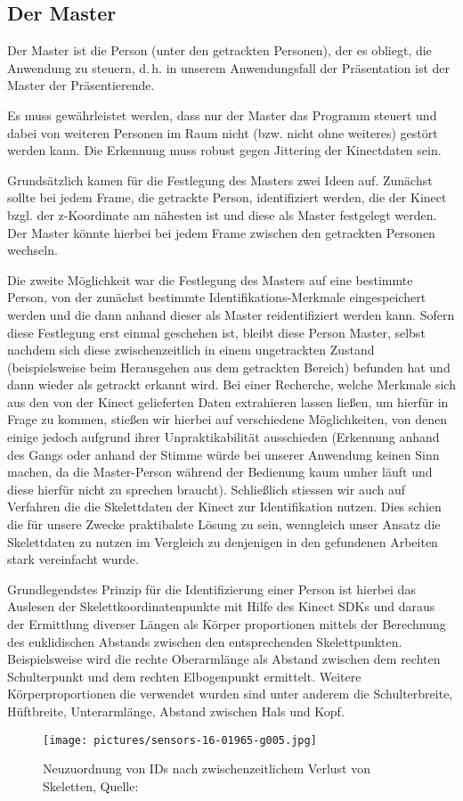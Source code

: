 \subsection{Der Master}
	Der Master ist die Person (unter den getrackten Personen), der es obliegt, die Anwendung zu steuern, d.\,h. in unserem Anwendungsfall der Präsentation ist der Master der Präsentierende.\par
	Es muss gewährleistet werden, dass nur der Master das Programm steuert und dabei von weiteren Personen im Raum nicht (bzw. nicht ohne weiteres) gestört werden kann. Die Erkennung muss robust gegen Jittering der Kinectdaten sein.\par
	Grundsätzlich kamen für die Festlegung des Masters zwei Ideen auf. Zunächst sollte bei jedem Frame, die getrackte Person, identifiziert werden, die der Kinect bzgl. der z-Koordinate am nähesten ist und diese als Master festgelegt werden. Der Master könnte hierbei bei jedem Frame zwischen den getrackten Personen wechseln. \par
	Die zweite Möglichkeit war die Festlegung des Masters auf eine bestimmte Person, von der zunächst bestimmte Identifikations-Merkmale eingespeichert werden und die dann anhand dieser als Master reidentifiziert werden kann. Sofern diese Festlegung erst einmal geschehen ist, bleibt diese Person Master, selbst nachdem sich diese zwischenzeitlich in einem ungetrackten Zustand (beispielsweise beim Herausgehen aus dem getrackten Bereich) befunden hat und dann wieder als getrackt erkannt wird. Bei einer Recherche, welche Merkmale sich aus den von der Kinect gelieferten Daten extrahieren lassen ließen, um hierfür in Frage zu kommen, stießen wir hierbei auf verschiedene Möglichkeiten, von denen einige jedoch aufgrund ihrer Unpraktikabilität ausschieden (Erkennung anhand des Gangs oder anhand der Stimme würde bei unserer Anwendung keinen Sinn machen, da die Master-Person während der Bedienung kaum umher läuft und diese hierfür nicht zu sprechen braucht). Schließlich stiessen wir auch auf Verfahren die die Skelettdaten der Kinect zur Identifikation nutzen. Dies schien die für unsere Zwecke praktibalste Lösung zu sein, wenngleich unser Ansatz die Skelettdaten zu nutzen im Vergleich zu denjenigen in den gefundenen Arbeiten stark vereinfacht wurde.\par
	Grundlegendstes Prinzip für die Identifizierung einer Person ist hierbei das Auslesen der Skelettkoordinatenpunkte mit Hilfe des Kinect SDKs und daraus der Ermittlung diverser Längen als Körper proportionen mittels der Berechnung des euklidischen Abstands zwischen den entsprechenden Skelettpunkten. Beispielsweise wird die rechte Oberarmlänge als Abstand zwischen dem rechten Schulterpunkt und dem rechten Elbogenpunkt ermittelt. Weitere Körperproportionen die verwendet wurden sind unter anderem die Schulterbreite, Hüftbreite, Unterarmlänge, Abstand zwischen Hals und Kopf.
	
\begin{figure}
\texttt{[image: pictures/sensors-16-01965-g005.jpg]}
\caption{Neuzuordnung von IDs nach zwischenzeitlichem \glqq Verlust\grqq{} von Skeletten, Quelle:\cite{bodyprop}}
\label{fig:fehlerk}
\end{figure}

	
	
	